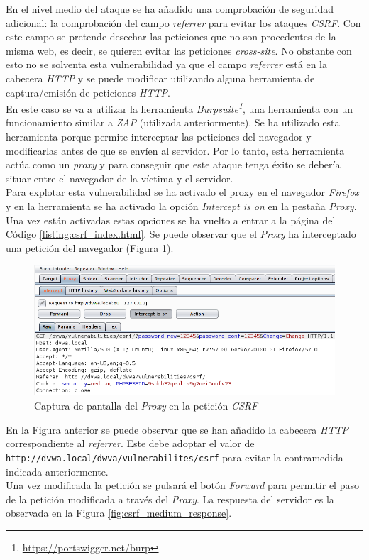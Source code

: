 \documentclass{article}
\begin{document}
En el nivel medio del ataque se ha añadido una comprobación de seguridad adicional: la comprobación del campo \textit{referrer} para evitar los ataques \textit{CSRF}. Con este campo se pretende desechar las peticiones que no son procedentes de la misma web, es decir, se quieren evitar las peticiones \textit{cross-site}. No obstante con esto no se solventa esta vulnerabilidad ya que el campo \textit{referrer} está en la cabecera \textit{HTTP} y se puede modificar utilizando alguna herramienta de captura/emisión de peticiones \textit{HTTP}.\\
En este caso se va a utilizar la herramienta \textit{Burpsuite\footnote{\url{https://portswigger.net/burp}}}, una herramienta con un funcionamiento similar a \textit{ZAP} (utilizada anteriormente). Se ha utilizado esta herramienta porque permite interceptar las peticiones del navegador y modificarlas antes de que se envíen al servidor. Por lo tanto, esta herramienta actúa como un \textit{proxy} y para conseguir que este ataque tenga éxito se debería situar entre el navegador de la víctima y el servidor.\\
Para explotar esta vulnerabilidad se ha activado el proxy en el navegador \textit{Firefox} y en la herramienta se ha activado la opción \textit{Intercept is on} en la pestaña \textit{Proxy}. Una vez están activadas estas opciones se ha vuelto a entrar a la página del Código \ref{listing:csrf_index.html}. Se puede observar que el \textit{Proxy} ha interceptado una petición del navegador (Figura \ref{fig:csrf_medium}).\\

\begin{figure}[h!]
    \centering
    \includegraphics[scale=0.6]{images/csrf_medium.png}
    \caption{Captura de pantalla del \textit{Proxy} en la petición \textit{CSRF}}
    \label{fig:csrf_medium}
\end{figure}

En la Figura anterior se puede observar que se han añadido la cabecera \textit{HTTP} correspondiente al \textit{referrer}. Este debe adoptar el valor de \texttt{http://dvwa.local/dwva/vulnerabilites/csrf} para evitar la contramedida indicada anteriormente.\\
Una vez modificada la petición se pulsará el botón \textit{Forward} para permitir el paso de la petición modificada a través del \textit{Proxy}. La respuesta del servidor es la observada en la Figura \ref{fig:csrf_medium_response}.\\
\end{document}
